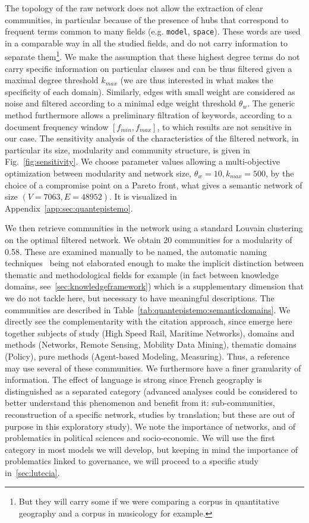 \documentclass[galley]{jtlu-article-2col}
\begin{document}
The topology of the raw network does not allow the extraction of clear communities, in particular because of the presence of hubs that correspond to frequent terms common to many fields (e.g. \texttt{model}, \texttt{space}). These words are used in a comparable way in all the studied fields, and do not carry information to separate them\footnote{But they will carry some if we were comparing a corpus in quantitative geography and a corpus in musicology for example.}. We make the assumption that these highest degree terms do not carry specific information on particular classes and can be thus filtered given a maximal degree threshold $k_{max}$ (we are thus interested in what makes the specificity of each domain). Similarly, edges with small weight are considered as noise and filtered according to a minimal edge weight threshold $\theta_w$. The generic method furthermore allows a preliminary filtration of keywords, according to a document frequency window $\left[ f_{min},f_{max} \right]$, to which results are not sensitive in our case. The sensitivity analysis of the characteristics of the filtered network, in particular its size, modularity and community structure, is given in Fig.~\ref{fig:sensitivity}. We choose parameter values allowing a multi-objective optimization between modularity and network size, $\theta_w = 10,k_{max} = 500$, by the choice of a compromise point on a Pareto front, what gives a semantic network of size $(V=7063,E=48952)$. It is visualized in Appendix~\ref{app:sec:quantepistemo}.

We then retrieve communities in the network using a standard Louvain clustering on the optimal filtered network. We obtain 20 communities for a modularity of 0.58. These are examined manually to be named, the automatic naming techniques~\cite{yang2000improving} being not elaborated enough to make the implicit distinction between thematic and methodological fields for example (in fact between knowledge domains, see~\ref{sec:knowledgeframework}) which is a supplementary dimension that we do not tackle here, but necessary to have meaningful descriptions. The communities are described in Table~\ref{tab:quantepistemo:semanticdomains}. We directly see the complementarity with the citation approach, since emerge here together subjects of study (High Speed Rail, Maritime Networks), domains and methods (Networks, Remote Sensing, Mobility Data Mining), thematic domains (Policy), pure methods (Agent-based Modeling, Measuring). Thus, a reference may use several of these communities. We furthermore have a finer granularity of information. The effect of language is strong since French geography is distinguished as a separated category (advanced analyses could be considered to better understand this phenomenon and benefit from it: sub-communities, reconstruction of a specific network, studies by translation; but these are out of purpose in this exploratory study). We note the importance of networks, and of problematics in political sciences and socio-economic. We will use the first category in most models we will develop, but keeping in mind the importance of problematics linked to governance, we will proceed to a specific study in~\ref{sec:lutecia}.
\end{document}
